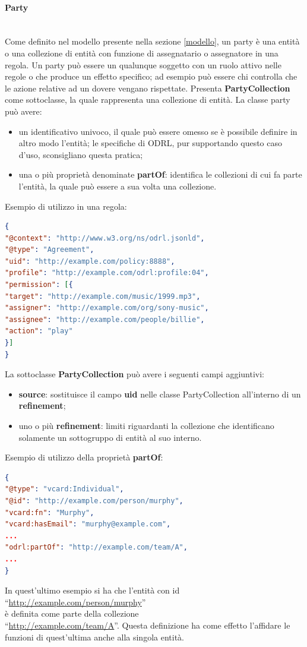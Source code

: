 \documentclass[12pt,a4paper,twoside]{book}
\begin{document}
\paragraph{Party}\mbox{}\\
Come definito nel modello presente nella sezione \ref{modello}, un party è una entità o una collezione di entità con funzione di assegnatario o assegnatore in una regola. Un party può essere un qualunque soggetto con un ruolo attivo nelle regole o che produce un effetto specifico; ad esempio può essere chi controlla che le azione relative ad un dovere vengano rispettate. Presenta \textbf{PartyCollection} come sottoclasse, la quale rappresenta una collezione di entità. La classe party può avere:
\begin{itemize}
	\item un identificativo univoco, il quale può essere omesso se è possibile definire in altro modo l'entità; le specifiche di ODRL, pur supportando questo caso d'uso, sconsigliano questa pratica;
	\item una o più proprietà denominate \textbf{partOf}: identifica le collezioni di cui fa parte l'entità, la quale può essere a sua volta una collezione.
\end{itemize}\newpage
Esempio di utilizzo in una regola:
\begin{lstlisting}[language=json,firstnumber=1,caption={Utilizzo di party nelle proprietà \textbf{assigner} ed \textbf{assignee} di una regola},captionpos=b,label=esempioParty]
{
"@context": "http://www.w3.org/ns/odrl.jsonld",
"@type": "Agreement",
"uid": "http://example.com/policy:8888",
"profile": "http://example.com/odrl:profile:04",
"permission": [{
"target": "http://example.com/music/1999.mp3",
"assigner": "http://example.com/org/sony-music",
"assignee": "http://example.com/people/billie",
"action": "play"
}]
}  
\end{lstlisting}
La sottoclasse \textbf{PartyCollection} può avere i seguenti campi aggiuntivi:
\begin{itemize}
	\item \textbf{source}: sostituisce il campo \textbf{uid} nelle classe PartyCollection all'interno di un \textbf{refinement};
	\item uno o più \textbf{refinement}: limiti riguardanti la collezione che identificano solamente un sottogruppo di entità al suo interno.
\end{itemize}
Esempio di utilizzo della proprietà \textbf{partOf}:
\begin{lstlisting}[language=json,firstnumber=1,caption={L'entità definita è parte di una PartyCollection},captionpos=b,label=esempioPartyColl]
{
"@type": "vcard:Individual",
"@id": "http://example.com/person/murphy",
"vcard:fn": "Murphy",
"vcard:hasEmail": "murphy@example.com",
...
"odrl:partOf": "http://example.com/team/A",
...
}
\end{lstlisting}
In quest'ultimo esempio si ha che l'entità con id \\``\url{http://example.com/person/murphy}''\\è definita come parte della collezione\\``\url{http://example.com/team/A}''. Questa definizione ha come effetto l'affidare le funzioni di quest'ultima anche alla singola entità.
\end{document}
